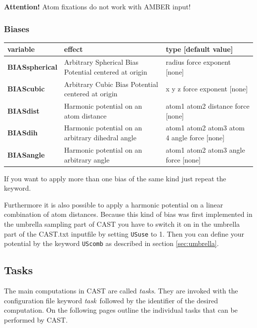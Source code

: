 \documentclass[10pt,a4paper]{article} %
\begin{document}
\textbf{Attention!} Atom fixations do not work with AMBER input!

\subsubsection{Biases}

\begin{longtable}{|p{3cm}|p{5cm}|p{3cm}|}
	variable & effect & type [default value] \\
	\hline
	\textbf{BIASspherical} & Arbitrary Spherical Bias Potential centered at origin & radius force exponent [none] \\
	\textbf{BIAScubic} & Arbitrary Cubic Bias Potential centered at origin & x y z force exponent [none] \\
	\textbf{BIASdist} & Harmonic potential on an atom distance & atom1 atom2 distance force [none] \\
	\textbf{BIASdih} & Harmonic potential on an arbitrary dihedral angle & atom1 atom2 atom3 atom 4 angle force [none] \\
	\textbf{BIASangle} & Harmonic potential on an arbitrary angle & atom1 atom2 atom3 angle force [none]
\end{longtable} 

If you want to apply more than one bias of the same kind just repeat the keyword.

Furthermore it is also possible to apply a harmonic potential on a linear combination of atom distances. Because this kind of bias was first implemented in the umbrella sampling part of CAST you have to switch it on in the umbrella part of the CAST.txt inputfile by setting \texttt{USuse} to 1. Then you can define your potential by the keyword \texttt{UScomb} as described in section \ref{sec:umbrella}.
	
	
	\subsection{Tasks}
	The main computations in \ac{CAST} are called \textit{tasks}. They are invoked with the configuration file keyword \glqq\textit{task}\grqq~followed by the identifier of the desired computation. On the following pages outline the individual tasks that can be performed by \ac{CAST}.

	\newpage

\end{document}
